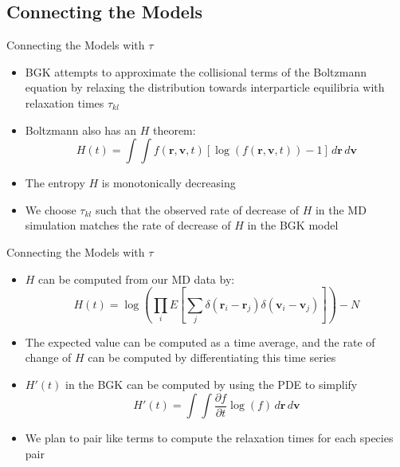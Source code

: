 \documentclass{beamer}
\begin{document}
	\subsection{Connecting the Models}
	\begin{frame}{Connecting the Models with $\tau$}
		\begin{itemize}
		\item BGK attempts to approximate the collisional terms of the Boltzmann equation by relaxing the distribution towards interparticle equilibria with relaxation times $\tau_{kl}$
		\vspace{1em}
		\item Boltzmann also has an $H$ theorem:
		\[H(t)=\int\int  f(\mathbf{r},\mathbf{v},t)\left[\log\left(f(\mathbf{r},\mathbf{v},t)\right)-1\right]\,d\mathbf{r}\,d\mathbf{v}
		\]\item The entropy $H$ is monotonically decreasing
		\vspace{1em}
		\item We choose $\tau_{kl}$ such that the observed rate of decrease of $H$ in the MD simulation matches the rate of decrease of $H$ in the BGK model
		\end{itemize}
	\end{frame}

	\begin{frame}{Connecting the Models with $\tau$}
		\begin{itemize}
		\item $H$ can be computed from our MD data by:
		\[H(t)=\log\left(\prod_iE\left[\sum_j\delta(\mathbf{r}_i-\mathbf{r}_j)\delta(\mathbf{v}_i-\mathbf{v}_j)\right]\right)-N
		\]\item The expected value can be computed as a time average, and the rate of change of $H$ can be computed by differentiating this time series
		\vspace{1em}
		\item $H'(t)$ in the BGK can be computed by using the PDE to simplify
		\[H'(t)=\int\int \frac{\partial f}{\partial t}\log(f)\,d\mathbf{r}\,d\mathbf{v}
		\]\item We plan to pair like terms to compute the relaxation times for each species pair
		\end{itemize}
	\end{frame}
	
\end{document}
